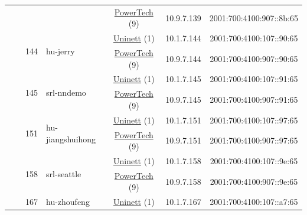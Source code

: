 \begin{small}
\begin{center}
\begin{longtable}{|c|c|c|c|c|c|c|c|}
  &  &  &  & \multicolumn{2}{|c|}{\tiny{\href{http://www.powertech.no}{PowerTech} (9)}} & \tiny{10.9.7.139} & \tiny{2001:700:4100:907::8b:65} \\* \cline{3-3}\cline{4-4}\cline{5-5}\cline{6-6}\cline{7-7}\cline{8-8}
  &  & \multirow{2}{*}{\tiny{144}} & \multicolumn{1}{|l|}{\multirow{2}{*}{\tiny{hu-jerry}}} & \multicolumn{2}{|c|}{\tiny{\href{https://www.uninett.no}{Uninett} (1)}} & \tiny{10.1.7.144} & \tiny{2001:700:4100:107::90:65} \\* \cline{5-5}\cline{6-6}\cline{7-7}\cline{8-8}
  &  &  &  & \multicolumn{2}{|c|}{\tiny{\href{http://www.powertech.no}{PowerTech} (9)}} & \tiny{10.9.7.144} & \tiny{2001:700:4100:907::90:65} \\* \cline{3-3}\cline{4-4}\cline{5-5}\cline{6-6}\cline{7-7}\cline{8-8}
  &  & \multirow{2}{*}{\tiny{145}} & \multicolumn{1}{|l|}{\multirow{2}{*}{\tiny{srl-nndemo}}} & \multicolumn{2}{|c|}{\tiny{\href{https://www.uninett.no}{Uninett} (1)}} & \tiny{10.1.7.145} & \tiny{2001:700:4100:107::91:65} \\* \cline{5-5}\cline{6-6}\cline{7-7}\cline{8-8}
  &  &  &  & \multicolumn{2}{|c|}{\tiny{\href{http://www.powertech.no}{PowerTech} (9)}} & \tiny{10.9.7.145} & \tiny{2001:700:4100:907::91:65} \\* \cline{3-3}\cline{4-4}\cline{5-5}\cline{6-6}\cline{7-7}\cline{8-8}
  &  & \multirow{2}{*}{\tiny{151}} & \multicolumn{1}{|l|}{\multirow{2}{*}{\tiny{hu-jiangshuihong}}} & \multicolumn{2}{|c|}{\tiny{\href{https://www.uninett.no}{Uninett} (1)}} & \tiny{10.1.7.151} & \tiny{2001:700:4100:107::97:65} \\* \cline{5-5}\cline{6-6}\cline{7-7}\cline{8-8}
  &  &  &  & \multicolumn{2}{|c|}{\tiny{\href{http://www.powertech.no}{PowerTech} (9)}} & \tiny{10.9.7.151} & \tiny{2001:700:4100:907::97:65} \\* \cline{3-3}\cline{4-4}\cline{5-5}\cline{6-6}\cline{7-7}\cline{8-8}
  &  & \multirow{2}{*}{\tiny{158}} & \multicolumn{1}{|l|}{\multirow{2}{*}{\tiny{srl-seattle}}} & \multicolumn{2}{|c|}{\tiny{\href{https://www.uninett.no}{Uninett} (1)}} & \tiny{10.1.7.158} & \tiny{2001:700:4100:107::9e:65} \\* \cline{5-5}\cline{6-6}\cline{7-7}\cline{8-8}
  &  &  &  & \multicolumn{2}{|c|}{\tiny{\href{http://www.powertech.no}{PowerTech} (9)}} & \tiny{10.9.7.158} & \tiny{2001:700:4100:907::9e:65} \\* \cline{3-3}\cline{4-4}\cline{5-5}\cline{6-6}\cline{7-7}\cline{8-8}
  &  & \multirow{2}{*}{\tiny{167}} & \multicolumn{1}{|l|}{\multirow{2}{*}{\tiny{hu-zhoufeng}}} & \multicolumn{2}{|c|}{\tiny{\href{https://www.uninett.no}{Uninett} (1)}} & \tiny{10.1.7.167} & \tiny{2001:700:4100:107::a7:65} \\* \cline{5-5}\cline{6-6}\cline{7-7}\cline{8-8}

\end{longtable}
\end{center}
\end{small}
